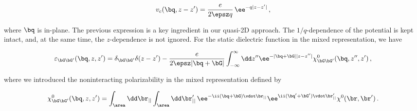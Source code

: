\begin{equation}
    v_{c}(\bq,z-z') =  \frac{e}{2 \epsz q} \, \ee^{- q|z-z'|}\,,
\end{equation}
\vspace{0.1cm}

\noindent where $\bq$ is in-plane.
The previous expression is a key ingredient in our quasi-2D approach.
The $1/q$-dependence of the potential is kept intact, and, at the same time, the $z$-dependence is not ignored.
For the static dielectric function in the mixed representation, we have

\begin{equation}
    \label{eq:dielectric_function_mixed_representation}
    \varepsilon_{\bG \bG'}(\bq,z,z') = \delta_{\bG \bG'} \delta( z-z')- \frac{e}{2\epsz|\bq +\bG|} \int_{-\infty}^{\infty} \dd z'' \ee^{-|\bq +\bG||z-z''|} \chi^{0}_{\bG \bG'}(\bq,z'',z')\,,
\end{equation}
\vspace{0.2cm}

\noindent where we introduced the noninteracting polarizability in the mixed representation defined by

\begin{equation}
    \chi^{0}_{\bG \bG'}(\bq,z,z') = \int_{\area} \dd \br_{||} \int_{\area} \dd \br_{||}' \, \ee^{-\ii (\bq + \bG) \vdot \br_{||}} \ee^{\ii (\bq' + \bG') \vdot \br_{||}'}\chi^{0}(\br,\br')\,.
\end{equation}
\vspace{0.3cm}

